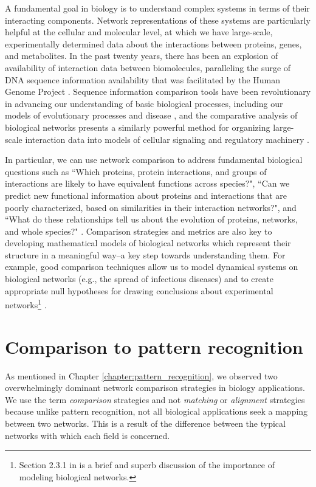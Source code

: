 \documentclass[12pt]{thesis}
\theoremstyle{plain}
\theoremstyle{definition}
\theoremstyle{remark}
\begin{document}
A fundamental goal in biology is to understand complex systems in terms of their interacting components. Network representations of these systems are particularly helpful at the cellular and molecular level, at which we have large-scale, experimentally determined data about the interactions between proteins, genes, and metabolites. In the past twenty years, there has been an explosion of availability of interaction data between biomolecules, paralleling the surge of DNA sequence information availability that was facilitated by the Human Genome Project \cite{humanGenomeProject}. Sequence information comparison tools have been revolutionary in advancing our understanding of basic biological processes, including our models of evolutionary processes and disease \cite{HGPimpact}, and the comparative analysis of biological networks presents a similarly powerful method for organizing large-scale interaction data into models of cellular signaling and regulatory machinery \cite{Sharan_2005}. 

In particular, we can use network comparison to address fundamental biological questions such as ``Which proteins, protein interactions, and groups of interactions are likely to have equivalent functions across species?", ``Can we predict new functional information about proteins and interactions that are poorly characterized, based on similarities in their interaction networks?", and ``What do these relationships tell us about the evolution of proteins, networks, and whole species?" \cite{Sharan_2006}. Comparison strategies and metrics are also key to developing mathematical models of biological networks which represent their structure in a meaningful way--a key step towards understanding them. For example, good comparison techniques allow us to model dynamical systems on biological networks \cite{Watts_1998} (e.g., the spread of infectious diseases) and to create appropriate null hypotheses for drawing conclusions about experimental networks\footnote{Section 2.3.1 in \cite{Hayes_2013} is a brief and superb discussion of the importance of modeling biological networks.}  \cite{Hayes_2013}.

\section{Comparison to pattern recognition}

As mentioned in Chapter \ref{chapter:pattern_recognition}, we observed two overwhelmingly dominant network comparison strategies in biology applications. We  use the term \textit{comparison} strategies and not \textit{matching} or \textit{alignment} strategies because unlike pattern recognition, not all biological applications seek a mapping between two networks. This is a result of the difference between the typical networks with which each field is concerned.
\end{document}
